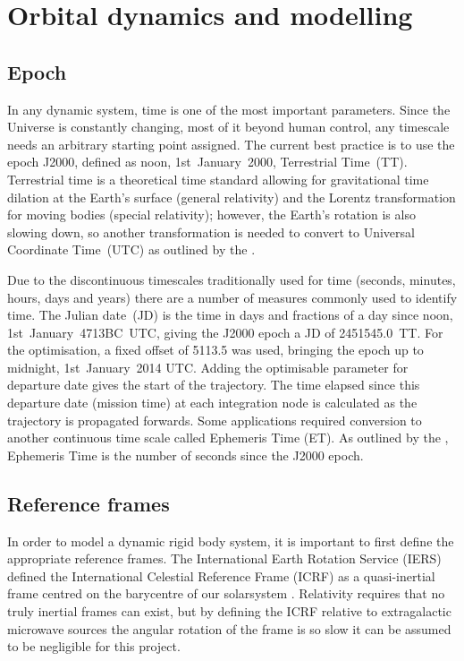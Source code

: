 \chapter{Orbital dynamics and modelling} \label{cha:Orbital-dynamics-and-modelling}

\section{Epoch} \label{sec:Epoch}

In any dynamic system, time is one of the most important parameters. Since the Universe is constantly changing, most of it beyond human control, any timescale needs an arbitrary starting point assigned. The current best practice is to use the epoch J2000, defined as noon, 1st~January~2000, Terrestrial Time~(TT). Terrestrial time is a theoretical time standard allowing for gravitational time dilation at the Earth's surface (general relativity) and the Lorentz transformation for moving bodies (special relativity); however, the Earth's rotation is also slowing down, so another transformation is needed to convert to Universal Coordinate Time~(UTC) as outlined by the \textcite[USNO, ][]{web_TimeServiceDept.2008}.

Due to the discontinuous timescales traditionally used for time (seconds, minutes, hours, days and years) there are a number of measures commonly used to identify time. The Julian date~(JD) is the time in days and fractions of a day since noon, 1st~January~4713BC~UTC, giving the J2000 epoch a JD of 2451545.0~TT. For the optimisation, a fixed offset of 5113.5 was used, bringing the epoch up to midnight, 1st~January~2014 UTC. Adding the optimisable parameter for departure date gives the start of the trajectory. The time elapsed since this departure date (mission time) at each integration node is calculated as the trajectory is propagated forwards. Some applications required conversion to another continuous time scale called Ephemeris Time (ET). As outlined by the \textcite{NAIF2010}, Ephemeris Time is the number of seconds since the J2000 epoch.




\section{Reference frames} \label{sec:Reference-frames}

In order to model a dynamic rigid body system, it is important to first define the appropriate reference frames. The International Earth Rotation Service (IERS) defined the International Celestial Reference Frame (ICRF) as a quasi-inertial frame centred on the barycentre of our solarsystem \parencite{Ma1998}. %
Relativity requires that no truly inertial frames can exist, but by defining the ICRF relative to extragalactic microwave sources the angular rotation of the frame is so slow it can be assumed to be negligible for this project.

